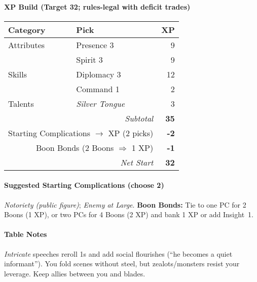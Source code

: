 \documentclass[11pt]{article}
\begin{document}
\paragraph{XP Build (Target 32; rules-legal with deficit trades)}
\begin{tabular}{@{}llr@{}}
\toprule
\textbf{Category} & \textbf{Pick} & \textbf{XP} \\
\midrule
Attributes & Presence 3 & 9 \\
           & Spirit 3 & 9 \\
Skills     & Diplomacy 3 & 12 \\
           & Command 1 & 2 \\
Talents    & \emph{Silver Tongue} & 3 \\
\midrule
\multicolumn{2}{r}{\textit{Subtotal}} & \textbf{35} \\
\multicolumn{2}{r}{Starting Complications $\rightarrow$ XP (2 picks)} & \textbf{-2} \\
\multicolumn{2}{r}{Boon Bonds (2 Boons $\Rightarrow$ 1 XP)} & \textbf{-1} \\
\midrule
\multicolumn{2}{r}{\textit{Net Start}} & \textbf{32} \\
\bottomrule
\end{tabular}

\paragraph{Suggested Starting Complications (choose 2)}
\emph{Notoriety (public figure)}; \emph{Enemy at Large}.  
\textbf{Boon Bonds:} Tie to one PC for 2 Boons (1 XP), or two PCs for 4 Boons (2 XP) and bank 1 XP or add Insight~1.

\paragraph{Table Notes}
\emph{Intricate} speeches reroll 1s and add social flourishes (“he becomes a quiet informant”). You fold scenes without steel, but zealots/monsters resist your leverage. Keep allies between you and blades.

\bigskip
\end{document}
